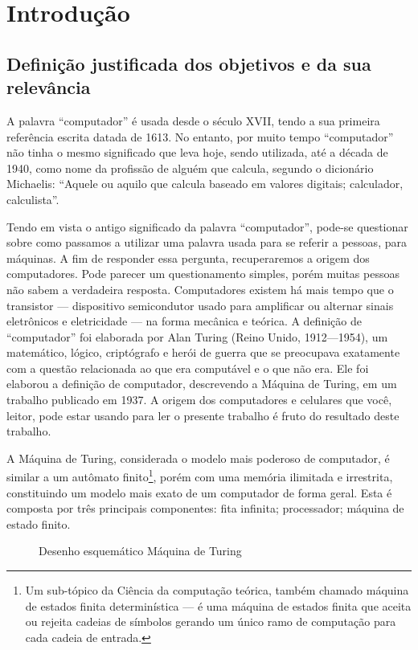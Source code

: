 \section{Introdução} 
\subsection{Definição justificada dos objetivos e da sua relevância}
A palavra ``computador'' é usada desde o século XVII, tendo a sua primeira referência escrita datada de 1613. No entanto, por muito tempo ``computador'' não tinha o mesmo significado que leva hoje, sendo utilizada, até a década de 1940, como nome da profissão de alguém que calcula, segundo o dicionário Michaelis: ``Aquele ou aquilo que calcula baseado em valores digitais; calculador, calculista''. \cite{4}

Tendo em vista o antigo significado da palavra ``computador'', pode-se questionar sobre como passamos a utilizar uma palavra usada para se referir a pessoas, para máquinas. A fim de responder essa pergunta, recuperaremos a origem dos computadores. Pode parecer um questionamento simples, porém muitas pessoas não sabem a verdadeira resposta. Computadores existem há mais tempo que o transistor — dispositivo semicondutor usado para amplificar ou alternar sinais eletrônicos e eletricidade — na forma mecânica e teórica. A definição de ``computador'' foi elaborada por Alan Turing (Reino Unido, 1912—1954), um matemático, lógico, criptógrafo e herói de guerra que se preocupava exatamente com a questão relacionada ao que era computável e o que não era. Ele foi elaborou a definição de computador, descrevendo a Máquina de Turing, em um trabalho publicado em 1937. A origem dos computadores e celulares que você, leitor, pode estar usando para ler o presente trabalho é fruto do resultado deste trabalho.

A Máquina de Turing, considerada o modelo mais poderoso de computador, é similar a um autômato finito\footnote{Um sub-tópico da Ciência da computação teórica, também chamado máquina de estados finita determinística — é uma máquina de estados finita que aceita ou rejeita cadeias de símbolos gerando um único ramo de computação para cada cadeia de entrada.}, porém com uma memória ilimitada e irrestrita, constituindo um modelo mais exato de um computador de forma geral. Esta é composta por três principais componentes: fita infinita; processador; máquina de estado finito.

\vspace{1cm}
\begin{figure}[H] \centering 
  \caption{\label{fig:1} Desenho esquemático Máquina de Turing} 
\end{figure}

